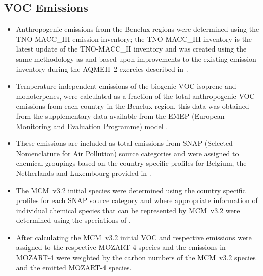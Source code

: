 \subsection{VOC Emissions} \label{ss:VOC_emissions}
\begin{itemize}
    \item Anthropogenic emissions from the Benelux regions were determined using the TNO-MACC\_III emission inventory; the TNO-MACC\_III inventory is the latest update of the TNO-MACC\_II inventory and was created using the same methodology as \citep{Kuenen:2014} and based upon improvements to the existing emission inventory during the AQMEII~2 exercies described in \citet{Pouliot:2015}. 
    \item Temperature independent emissions of the biogenic VOC isoprene and monoterpenes, were calculated as a fraction of the total anthropogenic VOC emissions from each country in the Benelux region, this data was obtained from the supplementary data available from the EMEP (European Monitoring and Evaluation Programme) model \citep{Simpson:2012}.
    \item These emissions are included as total emissions from SNAP (Selected Nomenclature for Air Pollution) source categories and were assigned to chemical groupings based on the country specific profiles for Belgium, the Netherlands and Luxembourg provided in \citet{Builtjes:2002}. 
    \item The MCM~v3.2 initial species were determined using the country specific profiles for each SNAP source category and where appropriate information of individual chemical species that can be represented by MCM~v3.2 were determined using the speciations of \citet{Passant:2002}. %
    \item After calculating the MCM~v3.2 initial VOC and respective emissions were assigned to the respective MOZART-4 species and the emissions in MOZART-4 were weighted by the carbon numbers of the MCM~v3.2 species and the emitted MOZART-4 species.
\end{itemize}

